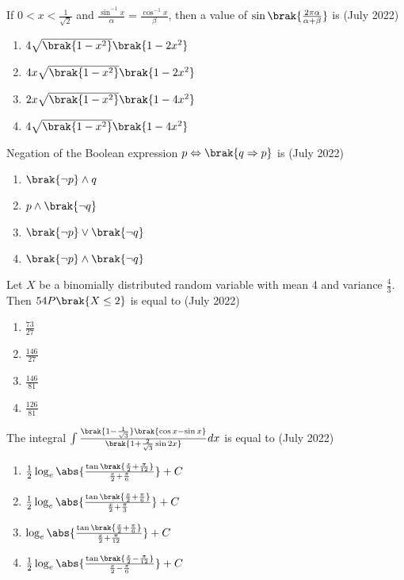 \iffalse
\title{07-26-2022-shift-2-16-30}
\author{AI24BTECH11011}
\section{mcq-single}
\fi
    \item If $0<x<\frac{1}{\sqrt{2}}$ and $\frac{\sin^{-1}x}{\alpha}=\frac{\cos^{-1}x}{\beta}$, then a value of $\sin\brak{\frac{2\pi\alpha}{\alpha+\beta}}$ is 
	    \hfill{(July 2022)}
	\begin{enumerate}
        \item $4\sqrt{\brak{1-x^2}}\brak{1-2x^2}$
        \item $4x\sqrt{\brak{1-x^2}}\brak{1-2x^2}$
        \item $2x\sqrt{\brak{1-x^2}}\brak{1-4x^2}$
        \item $4\sqrt{\brak{1-x^2}}\brak{1-4x^2}$
    \end{enumerate}
    \item Negation of the Boolean expression $p \Leftrightarrow \brak{q \Rightarrow p}$ is
    \hfill{(July 2022)} 
	\begin{enumerate}
        \item $\brak{\neg p} \land q$
        \item $p \land \brak{\neg q}$
        \item $\brak{\neg p} \lor \brak{\neg q}$
        \item $\brak{\neg p}\land \brak{\neg q}$
    \end{enumerate}
    \item Let $X$ be a binomially distributed random variable with mean 4 and variance $\frac{4}{3}$. Then $54 P \brak{X \leq 2}$ is equal to
    \hfill{(July 2022)} 
	\begin{enumerate}
        \item $\frac{73}{27}$
        \item $\frac{146}{27}$
        \item $\frac{146}{81}$
        \item $\frac{126}{81}$
    \end{enumerate}
    \item The integral $\int\frac{\brak{1-\frac{1}{\sqrt{3}}}\brak{\cos x - \sin x}}{\brak{1+\frac{2}{\sqrt{3}}\sin 2x}} dx$ is equal to 
   \hfill{(July 2022)} 
	\begin{enumerate}
        \item $\frac{1}{2}\log_e\abs{\frac{\tan\brak{\frac{x}{2}+\frac{\pi}{12}}}{\frac{x}{2}+\frac{\pi}{6}}} + C $
        \item $\frac{1}{2}\log_e\abs{\frac{\tan\brak{\frac{x}{2}+\frac{\pi}{6}}}{\frac{x}{2}+\frac{\pi}{3}}} + C $
        \item $\log_e\abs{\frac{\tan\brak{\frac{x}{2}+\frac{\pi}{6}}}{\frac{x}{2}+\frac{\pi}{12}}} + C $
        \item $\frac{1}{2}\log_e\abs{\frac{\tan\brak{\frac{x}{2}-\frac{\pi}{12}}}{\frac{x}{2}-\frac{\pi}{6}}} + C $
    \end{enumerate}
